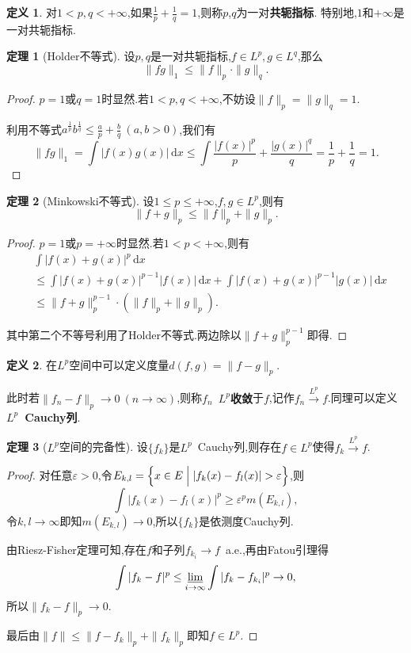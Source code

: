 \documentclass{ctexart}
\theoremstyle{definition}
\newtheorem{definition}{定义}
\newtheorem{theorem}{定理}
\theoremstyle{remark}
\begin{document}
	\begin{definition}
		对$1<p,q<+\infty$,如果$\frac{1}{p}+\frac{1}{q}=1$,则称$p$,$q$为一对\textbf{共轭指标}.
		特别地,$1$和$+\infty$是一对共轭指标.
	\end{definition}
	\begin{theorem}[Holder不等式]
		设$p,q$是一对共轭指标,$f\in L^p,g\in L^q$,那么
		$$\|fg\|_1\le\|f\|_p\cdot\|g\|_q.$$
	\end{theorem}
	\begin{proof}
		$p=1$或$q=1$时显然.若$1<p,q<+\infty$,不妨设$\|f\|_p=\|g\|_q=1$.
		
		利用不等式$a^\frac{1}{p}b^\frac{1}{q}\le\frac{a}{p}+\frac{b}{q}\ (a,b>0)$,我们有
		$$\|fg\|_1=\int{|f(x)g(x)|\,\mathrm{d}x}\le\int{\frac{|f(x)|^p}{p}+\frac{|g(x)|^q}{q}}=\frac{1}{p}+\frac{1}{q}=1.$$
	\end{proof}
	\begin{theorem}[Minkowski不等式]
		设$1\le p\le+\infty$,$f,g\in L^p$,则有
		$$\|f+g\|_p\le\|f\|_p+\|g\|_p.$$
	\end{theorem}
	\begin{proof}
		$p=1$或$p=+\infty$时显然.若$1<p<+\infty$,则有
		\begin{align*}
			& \int{|f(x)+g(x)|^p\,\mathrm{d}x} \\
			& \le \int{|f(x)+g(x)|^{p-1}|f(x)|\,\mathrm{d}x}+\int{|f(x)+g(x)|^{p-1}|g(x)|\,\mathrm{d}x} \\
			& \le \|f+g\|_p^{p-1}\cdot(\|f\|_p+\|g\|_p).
		\end{align*}
		
		其中第二个不等号利用了Holder不等式.两边除以$\|f+g\|_p^{p-1}$即得.
	\end{proof}
	
	\begin{definition}
		在$L^p$空间中可以定义度量$d(f,g)=\|f-g\|_p$.
		
		此时若$\|f_n-f\|_p\to 0\ (n\to\infty)$,则称$f_n$\ \textbf{$L^p$收敛}于$f$,记作$f_n\xrightarrow{L^p}f$.同理可以定义\textbf{$L^p$\ Cauchy列}.
	\end{definition}
	\begin{theorem}[$L^p$空间的完备性]
		设$\{f_k\}$是$L^p$\ Cauchy列,则存在$f\in L^p$使得$f_k\xrightarrow{L^p}f$.
	\end{theorem}
	\begin{proof}
		对任意$\varepsilon>0$,令$E_{k,l}=\Bigl\{x\in E\Bigm||f_k(x)-f_l(x)|>\varepsilon\Bigr\}$,则
		$$\int{|f_k(x)-f_l(x)|^p}\ge\varepsilon^pm(E_{k,l}),$$
		令$k,l\to\infty$即知$m(E_{k,l})\to0$,所以$\{f_k\}$是依测度Cauchy列.
		
		由Riesz-Fisher定理可知,存在$f$和子列$f_{k_i}\to f$\ a.e.,再由Fatou引理得
		$$\int{|f_k-f|^p}\le\varliminf_{i\to\infty}{\int{|f_k-f_{k_i}|^p}}\to0,$$
		所以$\|f_k-f\|_p\to0$.
		
		最后由$\|f\|\le\|f-f_k\|_p+\|f_k\|_p$即知$f\in L^p$.
	\end{proof}
	
\end{document}
